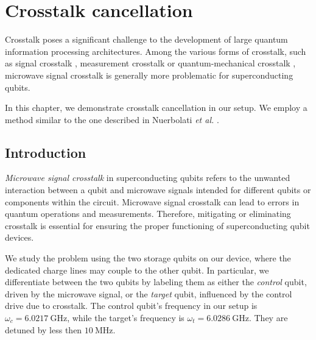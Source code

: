 \chapter{Crosstalk cancellation}
\label{chap:crosstalk}
\thispagestyle{fancy}

Crosstalk poses a significant challenge to the development of large quantum information processing architectures.
Among the various forms of crosstalk, such as signal crosstalk \cite{signal_crosstalk}, measurement crosstalk \cite{meas_crosstalk} or quantum-mechanical crosstalk \cite{QM_crosstalk}, microwave signal crosstalk is generally more problematic for superconducting qubits.

In this chapter, we demonstrate crosstalk cancellation in our setup. 
We employ a method similar to the one described in Nuerbolati \emph{et al.} \cite{crosstalk}.

\section{Introduction}

\emph{Microwave signal crosstalk} in superconducting qubits refers to the unwanted interaction between a qubit and microwave signals intended for different qubits or components within the circuit.
Microwave signal crosstalk can lead to errors in quantum operations and measurements.
Therefore, mitigating or eliminating crosstalk is essential for ensuring the proper functioning of superconducting qubit devices.

We study the problem using the two storage qubits on our device, where the dedicated charge lines may couple to the other qubit.
In particular, we differentiate between the two qubits by labeling them as either the \emph{control} qubit, driven by the microwave signal, or the \emph{target} qubit, influenced by the control drive due to crosstalk.
The control qubit's frequency in our setup is $\omega_c = \SI{6.0217}{\giga \hertz}$, while the target's frequency is $\omega_t = \SI{6.0286}{\giga \hertz}$.
They are detuned by less then $\SI{10}{\mega \hertz}$.

